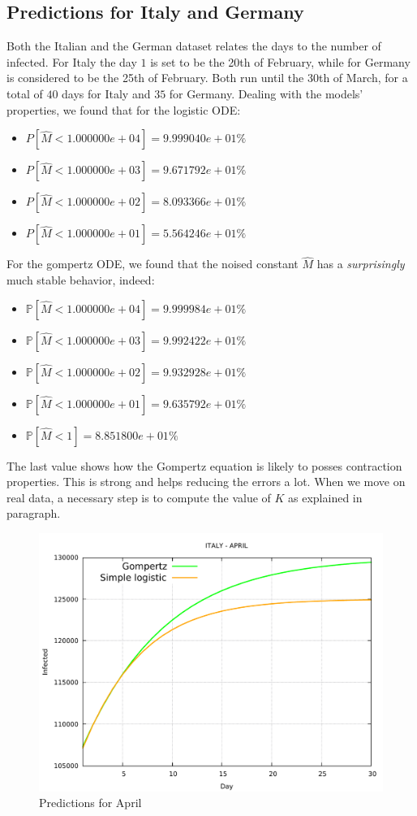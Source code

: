 \documentclass[6pt]{article}
\begin{document}
\subsection{Predictions for Italy and Germany}
Both the Italian and the German dataset relates the days to the number
of infected. For Italy the day $1$ is set to be the 20th of February,
while for Germany is considered to be the 25th of February.
Both run until the 30th of March, for a total of $40$ days for Italy
and $35$ for Germany.
Dealing with the models' properties, we found that for the logistic ODE:
\begin{itemize}
	\item $P[ \hat{M} < 1.000000e+04 ] = 9.999040e+01\%$
	\item $P[ \hat{M} < 1.000000e+03 ] = 9.671792e+01\%$
	\item $P[ \hat{M} < 1.000000e+02 ] = 8.093366e+01\%$
	\item $P[ \hat{M} < 1.000000e+01 ] = 5.564246e+01\%$
\end{itemize}
For the gompertz ODE, we found that the noised constant $\hat{M}$
has a \emph{surprisingly} much stable behavior, indeed:
\begin{itemize}
	\item $\mathbb{P}[ \hat{M} < 1.000000e+04 ] = 9.999984e+01\%$ 
	\item $\mathbb{P}[ \hat{M} < 1.000000e+03 ] = 9.992422e+01\%$ 
	\item $\mathbb{P}[ \hat{M} < 1.000000e+02 ] = 9.932928e+01\%$ 
	\item $\mathbb{P}[ \hat{M} < 1.000000e+01 ] = 9.635792e+01\%$ 
	\item $\mathbb{P}[ \hat{M} < 1 ] = 8.851800e+01\%$
\end{itemize}

The last value shows how the Gompertz equation is likely to posses
contraction properties. This is strong and helps reducing the
errors a lot.
When we move on real data, a necessary step is to compute the
value of $K$ as explained in paragraph.

\begin{figure}
  \includegraphics[width=\linewidth]{smaller_plot_april_italy.pdf}
  \caption{Predictions for April}
  \label{fig:boat1}
\end{figure}
\end{document}
